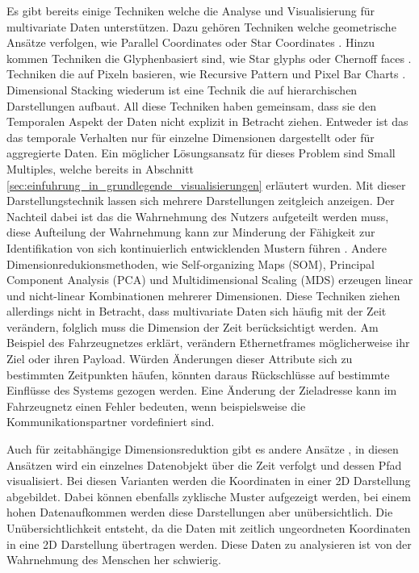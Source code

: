 \documentclass[draft=false
              ,paper=a4
              ,twoside=false
              ,fontsize=11pt
              ,headsepline
              ,BCOR10mm
              ,DIV11
              ]{scrbook}
\begin{document}
Es gibt bereits einige Techniken welche die Analyse und Visualisierung für multivariate Daten unterstützen. Dazu gehören Techniken welche geometrische Ansätze verfolgen, wie Parallel Coordinates \cite{inselberg_parallel_1987} oder Star Coordinates \cite{kandogan_star_2000}. Hinzu kommen Techniken die Glyphenbasiert sind, wie Star glyphs \cite{chambers_graphical_1983} oder Chernoff faces \cite{chernoff_use_1973}. Techniken die auf Pixeln basieren, wie Recursive Pattern \cite{keim_recursive_1995} und Pixel Bar Charts \cite{keim_pixel_2002}. Dimensional Stacking \cite{leblanc_exploring_1990} wiederum ist eine Technik die auf hierarchischen Darstellungen aufbaut. All diese Techniken haben gemeinsam, dass sie den Temporalen Aspekt der Daten nicht explizit in Betracht ziehen. Entweder ist das das temporale Verhalten nur für einzelne Dimensionen dargestellt oder für aggregierte Daten. Ein möglicher Lösungsansatz für dieses Problem sind Small Multiples, welche bereits in Abschnitt \ref{sec:einfuhrung_in_grundlegende_visualisierungen} erläutert wurden. Mit dieser Darstellungstechnik lassen sich mehrere Darstellungen zeitgleich anzeigen. Der Nachteil dabei ist das die Wahrnehmung des Nutzers aufgeteilt werden muss, diese Aufteilung der Wahrnehmung kann zur Minderung der Fähigkeit zur Identifikation von sich kontinuierlich entwicklenden Mustern führen \cite{alan_dix_human-computer_2004}. Andere Dimensionredukionsmethoden, wie Self-organizing Maps (SOM), Principal Component Analysis (PCA) und Multidimensional Scaling (MDS) erzeugen linear und nicht-linear Kombinationen mehrerer Dimensionen. Diese Techniken ziehen allerdings nicht in Betracht, dass multivariate Daten sich häufig mit der Zeit verändern, folglich muss die Dimension der Zeit berücksichtigt werden. Am Beispiel des Fahrzeugnetzes erklärt, verändern Ethernetframes möglicherweise ihr Ziel oder ihren Payload. Würden Änderungen dieser Attribute sich zu bestimmten Zeitpunkten häufen, könnten daraus Rückschlüsse auf bestimmte Einflüsse des Systems gezogen werden. Eine Änderung der Zieladresse kann im Fahrzeugnetz einen Fehler bedeuten, wenn beispielsweise die Kommunikationspartner vordefiniert sind. 

Auch für zeitabhängige Dimensionsreduktion gibt es andere Ansätze \cite{bernard_timeseriespaths_2012}\cite{mao_sequential_2007}\cite{ward_interactive_2010}, in diesen Ansätzen wird ein einzelnes Datenobjekt über die Zeit verfolgt und dessen Pfad visualisiert. Bei diesen Varianten werden die Koordinaten in einer 2D Darstellung abgebildet. Dabei können ebenfalls zyklische Muster aufgezeigt werden, bei einem hohen Datenaufkommen werden diese Darstellungen aber unübersichtlich. Die Unübersichtlichkeit entsteht, da die Daten mit zeitlich ungeordneten Koordinaten in eine 2D Darstellung übertragen werden. Diese Daten zu analysieren ist von der Wahrnehmung des Menschen her schwierig.
\end{document}
